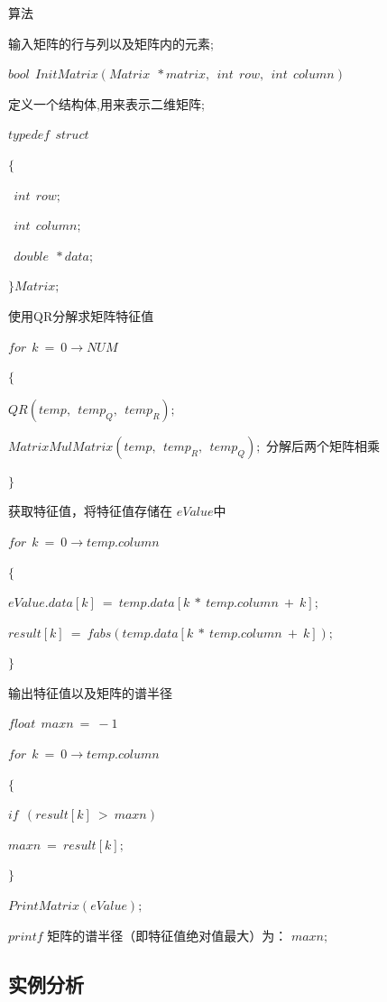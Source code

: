 \documentclass[cs4size,a4paper]{ctexart}
\numberwithin{equation}{section}
\numberwithin{table}{section}
\numberwithin{figure}{section}
\begin{document}
\begin{algorithm}[H]
\caption{算法}\label{algorithm}
输入矩阵的行与列以及矩阵内的元素;

$ bool~ ~InitMatrix(Matrix~ ~*matrix,~ ~int~ ~row,~ ~int~ ~column) $

定义一个结构体,用来表示二维矩阵;

$typedef~ ~struct $

$ \{ $

$     ~   ~int~ ~row; $

$     ~   ~int~ ~column; $

$     ~   ~double~ ~*data; $

$\}Matrix; $

使用QR分解求矩阵特征值

$ for~ ~k~=~0 \rightarrow NUM $

$ \{  $

$    QR(temp,~ ~temp_Q,~ ~temp_R); $

$	MatrixMulMatrix(temp,~ ~temp_R,~ ~temp_Q); $ 分解后两个矩阵相乘

$ \} $

获取特征值，将特征值存储在 $eValue$中

$ for~ ~k~=~0 \rightarrow temp.column$

$\{$

$eValue.data[k] ~=~ temp.data[k~*~temp.column ~+~ k];$

$result[k] ~=~ fabs(temp.data[k ~*~ temp.column ~+~ k]);$

$\}$

输出特征值以及矩阵的谱半径

$ float~ ~maxn~ =~ -1 $

$ for~ ~k~=~0 \rightarrow temp.column$

$\{$

$ if~ ~(result[k] ~>~ maxn)$

$maxn ~=~ result[k];$

$\}$

$ PrintMatrix(eValue); $
 
$printf $ 矩阵的谱半径（即特征值绝对值最大）为： $ maxn;$
\end{algorithm} 


\subsection{实例分析}
\end{document}
